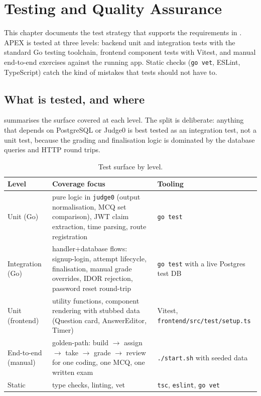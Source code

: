 \chapter{Testing and Quality Assurance}
\label{ch:testing}

This chapter documents the test strategy that supports the requirements in . APEX is tested at three levels: backend unit and integration tests with the standard Go testing toolchain, frontend component tests with Vitest, and manual end-to-end exercises against the running app. Static checks (\texttt{go vet}, ESLint, TypeScript) catch the kind of mistakes that tests should not have to.

\section{What is tested, and where}

 summarises the surface covered at each level. The split is deliberate: anything that depends on PostgreSQL or Judge0 is best tested as an integration test, not a unit test, because the grading and finalisation logic is dominated by the database queries and HTTP round trips.

\begin{table}[H]
  \centering
  \caption{Test surface by level.}
  \label{tab:test-pyramid}
  \small
  \begin{tabularx}{\linewidth}{l X X}
    \toprule
    Level & Coverage focus & Tooling \\
    \midrule
    Unit (Go)            & pure logic in \texttt{judge0} (output normalisation, MCQ set comparison), JWT claim extraction, time parsing, route registration  & \texttt{go test} \\
    Integration (Go)     & handler+database flows: signup-login, attempt lifecycle, finalisation, manual grade overrides, IDOR rejection, password reset round-trip & \texttt{go test} with a live Postgres test DB  \\
    Unit (frontend)      & utility functions, component rendering with stubbed data (Question card, AnswerEditor, Timer)                                          & Vitest, \texttt{frontend/src/test/setup.ts}  \\
    End-to-end (manual)  & golden-path: build $\to$ assign $\to$ take $\to$ grade $\to$ review for one coding, one MCQ, one written exam                  & \texttt{./start.sh} with seeded data           \\
    Static               & type checks, linting, vet                                                                                                              & \texttt{tsc}, \texttt{eslint}, \texttt{go vet} \\
    \bottomrule
  \end{tabularx}
\end{table}

